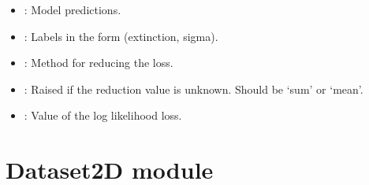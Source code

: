 \documentclass[letterpaper,10pt,english]{sphinxmanual}
\begin{document}
\begin{fulllineitems}
\begin{fulllineitems}
\begin{description}
\begin{itemize}
\item {} 
\sphinxAtStartPar
{}: Model predictions.

\item {} 
\sphinxAtStartPar
{}: Labels in the form (extinction, sigma).

\item {} 
\sphinxAtStartPar
{}: Method for reducing the loss.

\end{itemize}

\begin{itemize}
\item {} 
\sphinxAtStartPar
{}: Raised if the reduction value is unknown. Should be ‘sum’ or ‘mean’.

\end{itemize}

\begin{itemize}
\item {} 
\sphinxAtStartPar
{}: Value of the log likelihood loss.

\end{itemize}

\end{description}

\end{fulllineitems}


\end{fulllineitems}


\sphinxstepscope


\section{Dataset2D module}
\label{\detokenize{Dataset2D:module-Dataset2D}}\label{\detokenize{Dataset2D:dataset2d-module}}\label{\detokenize{Dataset2D::doc}}
\end{document}
